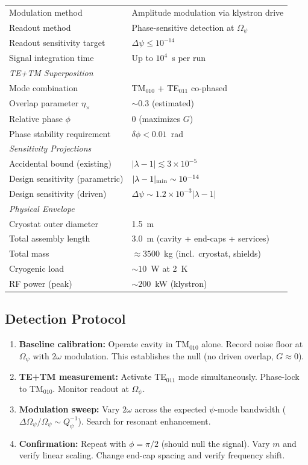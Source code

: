 \documentclass[11pt,a4paper]{article}
\begin{document}
\begin{longtable}{@{}p{6cm}p{8cm}@{}}
Modulation method & Amplitude modulation via klystron drive \\
Readout method & Phase-sensitive detection at $\Omega_\psi$ \\
Readout sensitivity target & $\Delta\psi \leq 10^{-14}$ \\
Signal integration time & Up to $10^4$~s per run \\
\midrule
\multicolumn{2}{l}{\textit{TE+TM Superposition}} \\
\midrule
Mode combination & TM$_{010}$ + TE$_{011}$ co-phased \\
Overlap parameter $\eta_\times$ & $\sim 0.3$ (estimated) \\
Relative phase $\phi$ & 0 (maximizes $G$) \\
Phase stability requirement & $\delta\phi < 0.01$~rad \\
\midrule
\multicolumn{2}{l}{\textit{Sensitivity Projections}} \\
\midrule
Accidental bound (existing) & $|\lambda-1| \lesssim 3\times 10^{-5}$ \\
Design sensitivity (parametric) & $|\lambda-1|_{\rm min} \sim 10^{-14}$ \\
Design sensitivity (driven) & $\Delta\psi \sim 1.2\times 10^{-3}|\lambda-1|$ \\
\midrule
\multicolumn{2}{l}{\textit{Physical Envelope}} \\
\midrule
Cryostat outer diameter & 1.5~m \\
Total assembly length & 3.0~m (cavity + end-caps + services) \\
Total mass & $\approx 3500$~kg (incl.\ cryostat, shields) \\
Cryogenic load & $\sim 10$~W at 2~K \\
RF power (peak) & $\sim 200$~kW (klystron) \\
\end{longtable}

\subsection{Detection Protocol}

\begin{enumerate}
\item \textbf{Baseline calibration:} Operate cavity in TM$_{010}$ alone.
Record noise floor at $\Omega_\psi$ with $2\omega$ modulation.  This
establishes the null (no driven overlap, $G \approx 0$).

\item \textbf{TE+TM measurement:} Activate TE$_{011}$ mode simultaneously.
Phase-lock to TM$_{010}$.  Monitor readout at $\Omega_\psi$.

\item \textbf{Modulation sweep:} Vary $2\omega$ across the expected
$\psi$-mode bandwidth ($\Delta\Omega_\psi/\Omega_\psi \sim Q_\psi^{-1}$).
Search for resonant enhancement.

\item \textbf{Confirmation:} Repeat with $\phi = \pi/2$ (should null
the signal).  Vary $m$ and verify linear scaling.  Change end-cap
spacing and verify frequency shift.
\end{enumerate}
\end{document}
